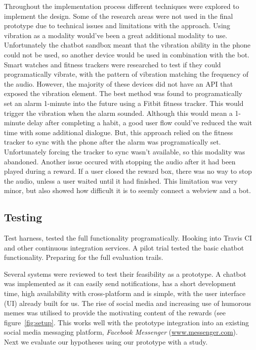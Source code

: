 Throughout the implementation process different techniques were explored to implement the design.
Some of the research areas were not used in the final prototype due to technical issues and limitations with the approach.\newline
\newline
Using vibration as a modality would've been a great additional modality to use.
Unfortunately the chatbot sandbox meant that the vibration ability in the phone could not be used, so another device would be used in combination with the bot.
Smart watches and fitness trackers were researched to test if they could programatically vibrate, with the pattern of vibration matching the frequency of the audio.
However, the majority of these devices did not have an API that exposed the vibration element. The best method was found to programatically set an alarm 1-minute into the future using a Fitbit fitness tracker.
This would trigger the vibration when the alarm sounded.
Although this would mean a 1-minute delay after completing a habit, a good user flow could've reduced the wait time with some additional dialogue.
But, this approach relied on the fitness tracker to sync with the phone after the alarm was programatically set. Unfortunately forcing the tracker to sync wasn't available, so this modality was abandoned.\newline
\newline
Another issue occured with stopping the audio after it had been played during a reward. If a user closed the reward box, there was no way to stop the audio, unless a user waited until it had finished. This limitation was very minor, but also showed how difficult it is to seemly connect a webview and a bot.


\subsection{Testing}

Test harness, tested the full functionality programatically. Hooking into Travis CI and other continuous integration services.
A pilot trial tested the basic chatbot functionality. Preparing for the full evaluation trails.


Several systems were reviewed to test their feasibility as a prototype. A chatbot was implemented as it can easily send notifications, has a short development time, high availability with cross-platform and is simple, with the user interface (UI) already built for us. The rise of social media and increasing use of humorous memes was utilised to provide the motivating content of the rewards (see figure~\ref{fig:setup}. This works well with the prototype integration into an existing social media messaging platform, \textit{Facebook Messenger} (\url{www.messenger.com}). Next we evaluate our hypotheses using our prototype with a study.
\newpage
